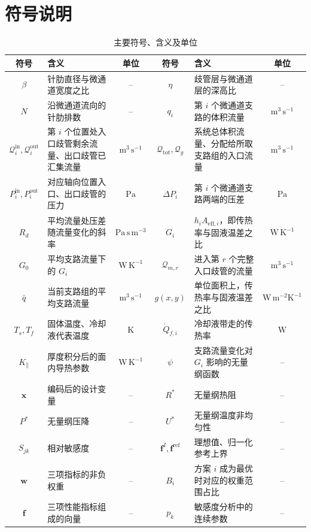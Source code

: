 \documentclass[withoutpreface,bwprint]{cumcmthesis}
\newcommand{\Rstar}{R^{*}}
\newcommand{\Pstar}{P^{*}}
\newcommand{\Ustar}{U^{*}}
\newcommand{\vect}[1]{\bm{#1}}
\begin{document}
\section{符号说明}
\begin{table}[H]
\centering
\caption{主要符号、含义及单位}
\small
\setlength{\tabcolsep}{4pt}
\begin{tabularx}{\textwidth}{cXc cXc}
\toprule
符号 & 含义 & 单位 & 符号 & 含义 & 单位\\
\midrule
$\beta$ & 针肋直径与微通道宽度之比 & -- & $\eta$ & 歧管层与微通道层的深高比 & --\\
$N$ & 沿微通道流向的针肋排数 & -- & $q_i$ & 第 $i$ 个微通道支路的体积流量 & $\mathrm{m^3\,s^{-1}}$\\
$\mathcal Q_i^{\mathrm{in}},\mathcal Q_i^{\mathrm{out}}$ & 第 $i$ 个位置处入口歧管剩余流量、出口歧管已汇集流量 & $\mathrm{m^3\,s^{-1}}$ & $\mathcal Q_{\mathrm{tot}},\mathcal Q_g$ & 系统总体积流量、分配给所取支路组的入口流量 & $\mathrm{m^3\,s^{-1}}$\\
$P_i^{\mathrm{in}},P_i^{\mathrm{out}}$ & 对应轴向位置入口、出口歧管的压力 & $\mathrm{Pa}$ & $\Delta P_i$ & 第 $i$ 个微通道支路两端的压差 & $\mathrm{Pa}$\\
$R_d$ & 平均流量处压差随流量变化的斜率 & $\mathrm{Pa\,s\,m^{-3}}$ & $G_i$ & $h_iA_{\mathrm{eff},i}$，即传热率与固液温差之比 & $\mathrm{W\,K^{-1}}$\\
$G_0$ & 平均支路流量下的 $G_i$ & $\mathrm{W\,K^{-1}}$ & $\mathcal Q_{m,r}$ & 进入第 $r$ 个完整入口歧管的流量 & $\mathrm{m^3\,s^{-1}}$\\
$\bar q$ & 当前支路组的平均支路流量 & $\mathrm{m^3\,s^{-1}}$ & $g(x,y)$ & 单位面积上，传热率与固液温差之比 & $\mathrm{W\,m^{-2}K^{-1}}$\\
$T_s,T_f$ & 固体温度、冷却液代表温度 & $\mathrm{K}$ & $\dot Q_{f,i}$ & 冷却液带走的传热率 & $\mathrm{W}$\\
$K_{\parallel}$ & 厚度积分后的面内导热参数 & $\mathrm{W\,K^{-1}}$ & $\psi$ & 支路流量变化对 $G_i$ 影响的无量纲函数 & --\\
$\vect x$ & 编码后的设计变量 & -- & $\Rstar$ & 无量纲热阻 & --\\
$\Pstar$ & 无量纲压降 & -- & $\Ustar$ & 无量纲温度非均匀性 & --\\
$S_{jk}$ & 相对敏感度 & -- & $\vect f^I,\vect f^{\mathrm{ref}}$ & 理想值、归一化参考上界 & --\\
$\vect w$ & 三项指标的非负权重 & -- & $B_i$ & 方案 $i$ 成为最优时对应的权重范围占比 & --\\
$\vect f$ & 三项性能指标组成的向量 & -- & $p_k$ & 敏感度分析中的连续参数 & --\\
\bottomrule
\end{tabularx}
\end{table}
\end{document}
